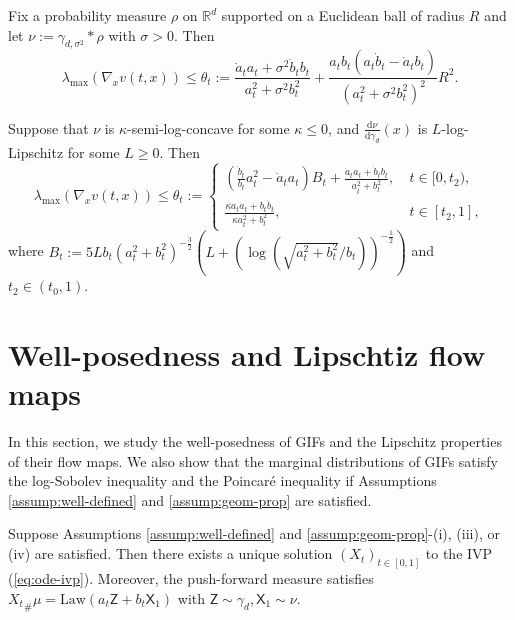 \documentclass[twoside,11pt]{article}
\def\sR{{\mathbb{R}}}
\def\paref#1{(\ref{#1})}
\newcommand{\diff}{\mathrm{d}}
\numberwithin{equation}{section}
\begin{document}
\begin{corollary} \label{cor:mog-bd}
Fix a probability measure $\rho$ on $\sR^d$ supported on a Euclidean ball of radius $R$ and let $\nu := \gamma_{d, \sigma^2} * \rho$ with $\sigma > 0$.
Then
\begin{equation}
    \label{eq:max-egv-mog}
    \lambda_{\max} (\nabla_x v(t, x)) \le \theta_t :=
    \frac{\dot{a}_t a_t + \sigma^2 \dot{b}_t b_t}{a_t^2 + \sigma^2 b_t^2} + \frac{a_t b_t (a_t \dot{b}_t - \dot{a}_t b_t)}{(a_t^2 + \sigma^2 b_t^2)^2} R^2.
\end{equation}
\end{corollary}


\begin{corollary} \label{cor:log-lip}
Suppose that $\nu$ is $\kappa$-semi-log-concave for some $\kappa \le 0$, and $\frac{\diff \nu}{\diff \gamma_d}(x)$ is $L$-log-Lipschitz for some $L \ge 0$. Then
\begin{equation}
    \label{eq:max-egv-ubd-log-lip}
    \lambda_{\max} (\nabla_x v(t, x)) \le \theta_t :=
    \begin{cases}
        \left( \tfrac{\dot{b}_t}{b_t} a_t^2 - \dot{a}_t a_t \right) B_t + \tfrac{\dot{a}_t a_t + \dot{b}_t b_t}{a_t^2 + b_t^2}, \ &t \in [0, t_2), \\
        \frac{\kappa a_t \dot{a}_t + b_t \dot{b}_t} {\kappa a_t^2 + b_t^2},  \ &t \in [t_2, 1],
    \end{cases}
\end{equation}
where $B_t := 5L b_t (a_t^2 + b_t^2)^{-\frac32} (L + (\log (\sqrt{a_t^2 + b_t^2}/b_t))^{-\frac12})$ and $t_2 \in (t_0, 1)$.
\end{corollary}


\section{Well-posedness and Lipschtiz flow maps} \label{sec:well-posed}

In this section, we study the well-posedness of GIFs and the Lipschitz properties of their flow maps.
We also show that the marginal distributions of GIFs satisfy the log-Sobolev inequality and the Poincar{\'e} inequality if Assumptions \ref{assump:well-defined} and \ref{assump:geom-prop} are satisfied.

\begin{theorem} \label{thm:well-posed}
Suppose Assumptions \ref{assump:well-defined} and \ref{assump:geom-prop}-(i), (iii), or (iv) are satisfied. Then there exists a unique solution $(X_t)_{t \in [0, 1]}$ to the
IVP \paref{eq:ode-ivp}. Moreover, the push-forward measure satisfies ${X_t}_{\#} \mu = \mathrm{Law}(a_t \mathsf{Z} + b_t \mathsf{X}_1)$ with $\mathsf{Z} \sim \gamma_d, \mathsf{X}_1 \sim \nu$.
\end{theorem}
\end{document}
